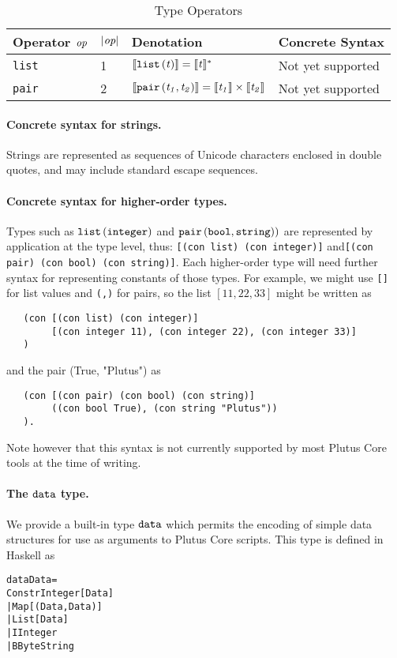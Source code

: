 \begin{table}[H]
  \centering
    \begin{tabular}{|l|p{14mm}|l|l|}
        \hline
        Operator $\textit{op}$ & $\left|\textit{op}\right|$  & Denotation & Concrete Syntax\\
        \hline
        \texttt{list} & 1 & $\llbracket\mathit{\mathtt{list}\,\mathtt{(}t\mathtt{)}}\rrbracket = \llbracket\mathit{t}\rrbracket^*$ & Not yet supported\\
        \texttt{pair} & 2 & $\llbracket\mathit{\mathtt{pair}\,\mathtt{(}t_1\mathtt{,}\,t_2\mathtt{)}}\rrbracket = \llbracket\mathit{t_1}\rrbracket \times \llbracket\mathit{t_2}\rrbracket$ & Not yet supported\\
        \hline
        \end{tabular}
   \caption{Type Operators}
    \label{table:V1-built-in-type-operators}
\end{table}

\paragraph{Concrete syntax for strings.} Strings are represented as sequences of Unicode characters
enclosed in double quotes, and may include standard escape sequences.

\paragraph{Concrete syntax for higher-order types.} Types such as $\mathtt{list}\,\mathtt{(}\mathtt{integer}\mathtt{)}$
and $\mathtt{pair}\,\mathtt{(}\mathtt{bool}\mathtt{,}\,\mathtt{string)}\mathtt{)}$ are represented by application at the
type level, thus: \texttt{[(con list) (con integer)]} and\texttt{[(con pair)
    (con bool) (con string)]}.  Each higher-order type will need further syntax
for representing constants of those types.  For example, we might use
\texttt{[]} for list values and \texttt{(,)} for pairs, so the list $[11,22,33]$
might be written as
\begin{verbatim}
   (con [(con list) (con integer)] 
        [(con integer 11), (con integer 22), (con integer 33)]
   )
\end{verbatim}
and the pair (True, "Plutus") as
\begin{verbatim}
   (con [(con pair) (con bool) (con string)] 
        ((con bool True), (con string "Plutus"))
   ).
\end{verbatim}
Note however that this syntax is not currently supported by most Plutus Core tools at the time of writing.



\paragraph{The $\mathtt{data}$ type.}
We provide a built-in type $\mathtt{data}$ which permits the encoding of simple data structures
for use as arguments to Plutus Core scripts.  This type is defined in Haskell as 
\begin{alltt}
   data Data =
      Constr Integer [Data]
      | Map [(Data, Data)]
      | List [Data]
      | I Integer
      | B ByteString
\end{alltt}

